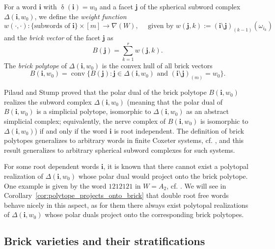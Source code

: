 \documentclass[a4paper, 11pt]{amsart}
\newcommand{\conv}{\operatorname{conv}}
\newcommand{\word}[1]{\mathbf{#1}}
\DeclareMathOperator{\dem}{\delta}
\theoremstyle{definition}
\begin{document}
For a word $\word{i}$ with $\dem(\word{i}) = w_0$ and a facet $\word{j}$  of the spherical subword complex $\Delta(\word{i}, w_0)$, we define the \emph{weight function}
\begin{equation}\label{eq:weight fct}
    w(\cdot,\cdot):\{\text{subwords of }\word{i}\} \times [m] \to \nabla(W), \quad \text{ given by } w(\word{j},k):=(\word{i}\setminus \word{j})_{(k-1)}(\omega_{i_k})
\end{equation}
and the \emph{brick vector} of the facet $\word{j}$ as
\begin{equation}\label{eq:brick vector}
    B(\word{j})=\sum_{k=1}^r w(\word{j},k).
\end{equation}
The \emph{brick polytope} of $\Delta(\word{i},w_0)$ is the convex hull of all brick vectors
\begin{equation}\label{eq:brick polytope}
    B(\word{i},w_0)=\conv\{B(\word{j}) : \word{j} \in \Delta(\word{i},w_0) \text{ and } (\word{i}\setminus \word{j})_{(m)} = w_0\}.
\end{equation}

Pilaud and Stump \cite[Theorem 4.8, Section 7]{pilaud_stump_15} proved that the polar dual of the brick polytope $B(\word{i},w_0)$ realizes the subword complex  $\Delta(\word{i}, w_0)$ (meaning that the polar dual of $B(\word{i},w_0)$ is a simplicial polytope, isomorphic to $\Delta(\word{i}, w_0)$ as an abstract simplicial complex; equivalently, the nerve complex of $B(\word{i},w_0)$ is isomorphic to $\Delta(\word{i}, w_0)$) if and only if the word $\word{i}$ is root independent. The definition of brick polytopes generalizes to arbitrary words in finite Coxeter systems, cf. \cite{escobar}, and this result generalizes to arbitrary spherical subword complexes for such systems. 

For some root dependent words $\word{i}$, 
it is known that there cannot exist a polytopal realization of $\Delta(\word{i}, w_0)$ whose polar dual would project onto the brick polytope. One example is given by the word $1212121$ in $W = A_2$, cf. \cite[Proposition 5.9]{pilaud_santos_12}.
We will see in Corollary~\ref{cor:polytope_projects_onto_brick} that double root free words behave nicely in this aspect, as for them there always exist  polytopal realizations of $\Delta(\word{i}, w_0)$ whose polar duals project onto the corresponding brick polytopes.


\medskip


\subsection{Brick varieties and their stratifications}
\end{document}

